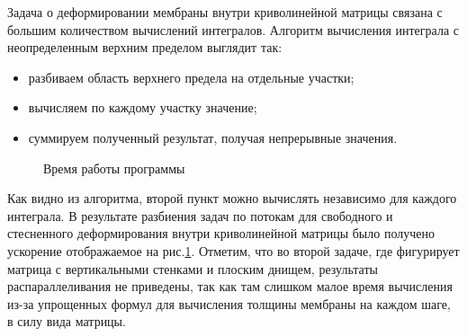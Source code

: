 Задача о деформировании мембраны внутри криволинейной матрицы связана с большим количеством вычислений интегралов. Алгоритм вычисления интеграла с неопределенным верхним пределом выглядит так:
\begin{itemize}
\item разбиваем область верхнего предела на отдельные участки;
\item вычисляем по каждому участку значение;
\item суммируем полученный результат, получая непрерывные значения.
\end{itemize}
		\begin{figure}[h!]
				\caption{ Время работы программы } 
				\label{parall_results}
	    \end{figure}

Как видно из алгоритма, второй пункт можно вычислять независимо для каждого интеграла. В результате разбиения задач по потокам для свободного и стесненного деформирования внутри криволинейной матрицы было получено ускорение отображаемое на рис.\ref{parall_results}. Отметим, что во второй задаче, где фигурирует матрица с вертикальными стенками и плоским днищем, результаты распараллеливания не приведены, так как там слишком малое время вычисления из-за упрощенных формул для вычисления толщины мембраны на каждом шаге, в силу вида матрицы.

